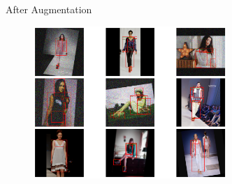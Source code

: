 \begin{frame}{After Augmentation}

\begin{figure}[H]
    \centering
    \includegraphics[width=0.65\textwidth]{images/after_augmented.png}
\end{figure}

\end{frame}

